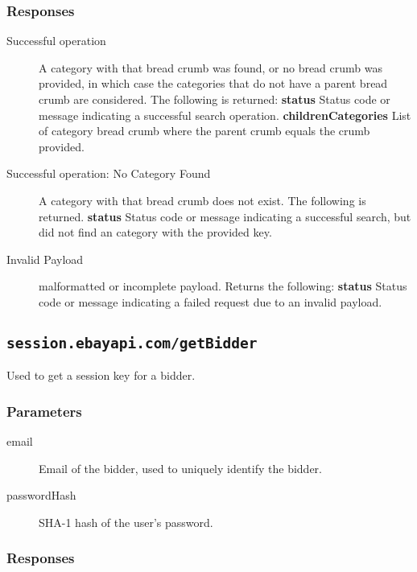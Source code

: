 \documentclass{article}
\newcommand{\code}[1]{\colorbox{light-gray}{\texttt{#1}}}
\begin{document}
\subsubsection{Responses}

\begin{description}
    \item[Successful operation] A category with that bread crumb was found, or
        no bread crumb was provided, in which case the categories that do not
        have a parent bread crumb are considered. The following is returned:
        \subitem\textbf{status} Status code or message indicating a successful search operation.
        \subitem\textbf{childrenCategories} List of category bread crumb where the parent crumb equals the crumb provided.

    \item[Successful operation: No Category Found] A category with that
        bread crumb does not exist. The following is returned.
        \subitem\textbf{status} Status code or message indicating a successful
        search, but did not find an category with the provided key.

    \item[Invalid Payload] malformatted or incomplete payload. Returns the
        following:
        \subitem\textbf{status} Status code or message indicating a failed
        request due to an invalid payload.

\end{description}

\subsection{\code{session.ebayapi.com/getBidder}}
Used to get a session key for a bidder.

\subsubsection{Parameters}

\begin{description}
    \item[email] Email of the bidder, used to uniquely identify the bidder.
    \item[passwordHash] SHA-1 hash of the user's password.
\end{description}

\subsubsection{Responses}
\end{document}
